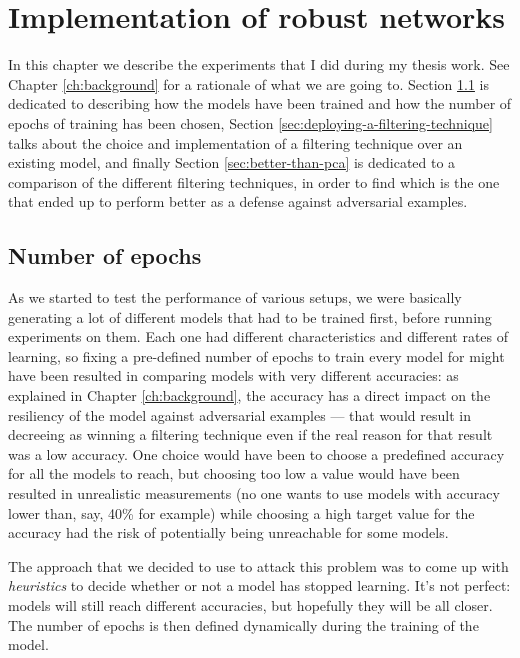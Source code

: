 \chapter{Implementation of robust networks}
\label{ch:implementation-of-robust-networks}

In this chapter we describe the experiments that I did during my thesis
work. See Chapter \ref{ch:background} for a rationale of what we are
going to. Section \ref{sec:number-of-epochs} is dedicated to describing
how the models have been trained and how the number of epochs of
training has been chosen, Section
\ref{sec:deploying-a-filtering-technique} talks about the choice and
implementation of a filtering technique over an existing model, and
finally Section \ref{sec:better-than-pca} is dedicated to a comparison
of the different filtering techniques, in order to find which is the
one that ended up to perform better as a defense against adversarial
examples.

\section{Number of epochs}
\label{sec:number-of-epochs}

As we started to test the performance of various setups, we were
basically generating a lot of different models that had to be trained
first, before running experiments on them. Each one had different
characteristics and different rates of learning, so fixing a
pre-defined number of epochs to train every model for might have been
resulted in comparing models with very different accuracies: as
explained in Chapter \ref{ch:background}, the accuracy has a direct
impact on the resiliency of the model against adversarial examples ---
that would result in decreeing as winning a filtering technique even if
the real reason for that result was a low accuracy. One choice would
have been to choose a predefined accuracy for all the models to reach,
but choosing too low a value would have been resulted in unrealistic
measurements (no one wants to use models with accuracy lower than, say,
40\% for example) while choosing a high target value for the accuracy had the
risk of potentially being unreachable for some models.

The approach that we decided to use to attack this problem was to come
up with \emph{heuristics} to decide whether or not a model has stopped
learning. It's not perfect: models will still reach different
accuracies, but hopefully they will be all closer. The number of epochs
is then defined dynamically during the training of the model.

